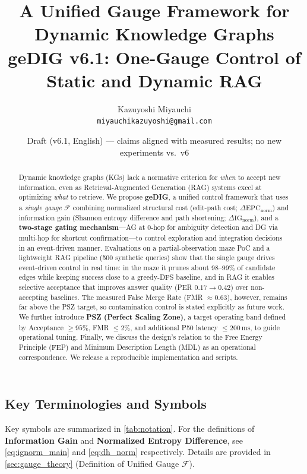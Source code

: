\documentclass[12pt]{article}
\title{A Unified Gauge Framework for Dynamic Knowledge Graphs\\[0.3em]
  \large geDIG v6.1: One-Gauge Control of Static and Dynamic RAG}
\author{Kazuyoshi Miyauchi\\
  \small\texttt{miyauchikazuyoshi@gmail.com}}
\date{Draft (v6.1, English) --- claims aligned with measured results; no new experiments vs.\ v6}
\newcommand{\F}{\mathcal{F}}
\newcommand{\gednorm}{\Delta\mathrm{EPC}_{\mathrm{norm}}}
\newcommand{\ignorm}{\Delta\mathrm{IG}_{\mathrm{norm}}}
\begin{document}
\maketitle
\sloppy

\begin{abstract}
Dynamic knowledge graphs (KGs) lack a normative criterion for \emph{when} to accept new information, even as Retrieval-Augmented Generation (RAG) systems excel at optimizing \emph{what} to retrieve.
We propose \textbf{geDIG}, a unified control framework that uses a \emph{single gauge} $\F$ combining normalized structural cost (edit-path cost; $\gednorm$) and information gain (Shannon entropy difference and path shortening; $\ignorm$), and a \textbf{two-stage gating mechanism}---AG at 0-hop for ambiguity detection and DG via multi-hop for shortcut confirmation---to control exploration and integration decisions in an event-driven manner.
Evaluations on a partial-observation maze PoC and a lightweight RAG pipeline (500 synthetic queries) show that the single gauge drives event-driven control in real time: in the maze it prunes about 98--99\% of candidate edges while keeping success close to a greedy-DFS baseline, and in RAG it enables selective acceptance that improves answer quality (PER $0.17\to0.42$) over non-accepting baselines. The measured False Merge Rate (FMR $\approx 0.63$), however, remains far above the PSZ target, so contamination control is stated explicitly as future work.
We further introduce \textbf{PSZ (Perfect Scaling Zone)}, a target operating band defined by Acceptance $\ge 95\%$, FMR $\le 2\%$, and additional P50 latency $\le 200$\,ms, to guide operational tuning.
Finally, we discuss the design's relation to the Free Energy Principle (FEP) and Minimum Description Length (MDL) as an operational correspondence.
We release a reproducible implementation and scripts.
\end{abstract}

\subsection*{Key Terminologies and Symbols}
Key symbols are summarized in \cref{tab:notation}.
For the definitions of \textbf{Information Gain} and \textbf{Normalized Entropy Difference}, see \cref{eq:ignorm_main} and \cref{eq:dh_norm} respectively.
Details are provided in \cref{sec:gauge_theory} (Definition of Unified Gauge $\F$).
\end{document}
